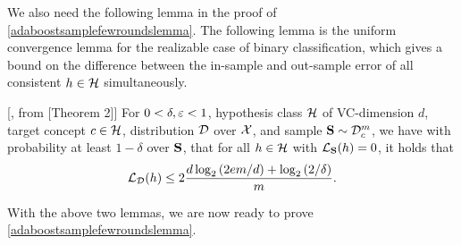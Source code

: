 We also need the following lemma in the proof of \cref{adaboostsamplefewroundslemma}. The following lemma is the uniform convergence lemma for the realizable case of binary classification, which gives a bound on the difference between the in-sample and out-sample error of all consistent $h\in \mathcal{H}$ simultaneously.

\begin{lemma}\label{uniformconvergence}[\cite{vapnik74theory}, \cite{Blumeruniformconvergence} from \cite{Simons}[Theorem 2]]
 For $0<\delta,\varepsilon<1$, hypothesis class $\mathcal{H}$ of VC-dimension $d$, target concept $c\in\mathcal{H}$, distribution $\mathcal{D}$ over $\mathcal{X}$, and sample $\mathbf{S}\sim\mathcal{D}_{c}^{m}$,  we have with probability at least $1-\delta$ over $\mathbf{S}$, that for all $h\in \mathcal{H}$ with $\operatorname{\mathcal{L}}_{\mathbf{S}}(h)=0$, it holds that
    \begin{align*}
    \operatorname{\mathcal{L}}_{\mathcal{D}}(h)\leq 2\frac{d\log_{2}{\left(2em/d \right)}+\log_{2}{\left(2/\delta \right)}}{m}.
    \end{align*}
\end{lemma}

With the above two lemmas, we are now ready to prove \cref{adaboostsamplefewroundslemma}.

